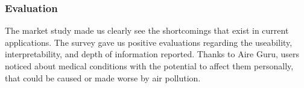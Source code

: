 \subsubsection*{Evaluation}

\begin{itemize}
    \done The market study made us clearly see the shortcomings that exist in current applications.
    \done The survey gave us positive evaluations regarding the useability, interpretability, and depth of information reported.
    \done Thanks to Aire Guru, users noticed about medical conditions with the potential to affect them personally, that could be caused or made worse by air pollution.
\end{itemize}